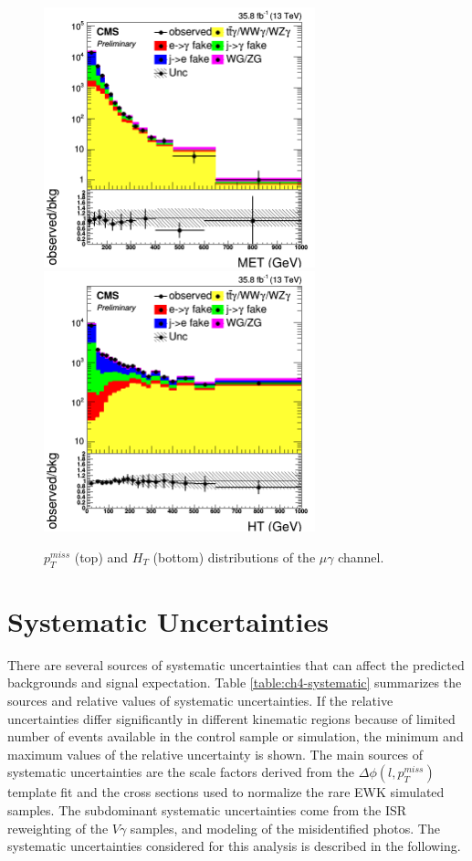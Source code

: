 \documentclass[thesis.tex]{subfiles}
\renewcommand\_{\textunderscore\allowbreak}
\begin{document}
\begin{figure}[hbtp]
  \centering
    \includegraphics[width=0.7\textwidth]{Figures/VALID_mg_2016ReMiniAOD_met_TT.png} \\
    \includegraphics[width=0.7\textwidth]{Figures/VALID_mg_2016ReMiniAOD_ht_TT.png}
  \caption{$p_T^{miss}$ (top) and $H_T$ (bottom) distributions of the $\mu\gamma$ channel.}
    \label{fig:ttgvalidationmg}
\end{figure}

\section{Systematic Uncertainties}
There are several sources of systematic uncertainties that can affect the predicted backgrounds and signal expectation.
Table \ref{table:ch4-systematic} summarizes the sources and relative values of systematic uncertainties.
If the relative uncertainties differ significantly in different kinematic regions because of limited number of events available in the control sample or simulation, the minimum and maximum values of the relative uncertainty is shown.
The main sources of systematic uncertainties are the scale factors derived from the $\Delta\phi(l,p_{T}^{miss})$ template fit and the cross sections used to normalize the rare EWK simulated samples.
The subdominant systematic uncertainties come from the ISR reweighting of the $V\gamma$ samples, and modeling of the misidentified photos. 
The systematic uncertainties considered for this analysis is described in the following. 
\end{document}
